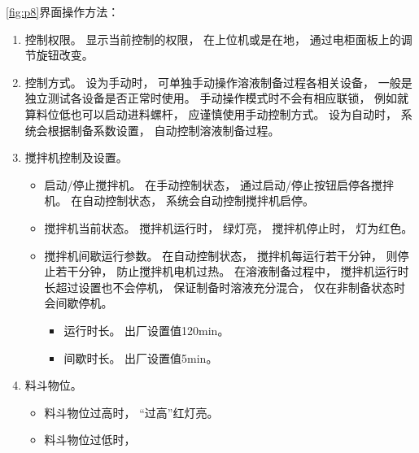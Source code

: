 \documentclass[UTF8,a4paper,12pt,titlepage]{ctexart}
\begin{document}
      

      \newpage

      \ref{fig:p8}界面操作方法：
      \begin{enumerate}
         \item 控制权限。
            显示当前控制的权限，
            在上位机或是在地，
            通过电柜面板上的调节旋钮改变。
         \item 控制方式。
            设为手动时，
            可单独手动操作溶液制备过程各相关设备，
            一般是独立测试各设备是否正常时使用。
            手动操作模式时不会有相应联锁，
            例如就算料位低也可以启动进料螺杆，
            应谨慎使用手动控制方式。
            设为自动时，
            系统会根据制备系数设置，
            自动控制溶液制备过程。
         \item 搅拌机控制及设置。
            \begin{itemize}
               \item 启动/停止搅拌机。
                  在手动控制状态，
                  通过启动/停止按钮启停各搅拌机。
                  在自动控制状态，
                  系统会自动控制搅拌机启停。
               \item 搅拌机当前状态。
                  搅拌机运行时，
                  绿灯亮，
                  搅拌机停止时，
                  灯为红色。
               \item 搅拌机间歇运行参数。
                  在自动控制状态，
                  搅拌机每运行若干分钟，
                  则停止若干分钟，
                  防止搅拌机电机过热。
                  在溶液制备过程中，
                  搅拌机运行时长超过设置也不会停机，
                  保证制备时溶液充分混合，
                  仅在非制备状态时会间歇停机。
                  \begin{itemize}
                     \item 运行时长。
                        出厂设置值120min。
                     \item 间歇时长。
                        出厂设置值5min。
                  \end{itemize}
            \end{itemize}
         \item 料斗物位。
            \begin{itemize}
                \item 料斗物位过高时，
                    “过高”红灯亮。
                \item 料斗物位过低时，

\end{itemize}
\end{enumerate}
\end{document}
